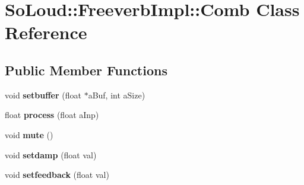 \hypertarget{class_so_loud_1_1_freeverb_impl_1_1_comb}{}\section{So\+Loud\+::Freeverb\+Impl\+::Comb Class Reference}
\label{class_so_loud_1_1_freeverb_impl_1_1_comb}
\subsection*{Public Member Functions}
\begin{DoxyCompactItemize}
\item 
\mbox{\label{class_so_loud_1_1_freeverb_impl_1_1_comb_a73d6b9bffd5dc9d15f9dc405a2eaca74}} 
void {\bfseries setbuffer} (float $\ast$a\+Buf, int a\+Size)
\item 
\mbox{\label{class_so_loud_1_1_freeverb_impl_1_1_comb_a05456e28baf24a7c9c4e41affc60df97}} 
float {\bfseries process} (float a\+Inp)
\item 
\mbox{\label{class_so_loud_1_1_freeverb_impl_1_1_comb_a6bb88f40114912fa6919b05a55907b8a}} 
void {\bfseries mute} ()
\item 
\mbox{\label{class_so_loud_1_1_freeverb_impl_1_1_comb_ab08a2f4a92b27dc27031f11fd7a4cfd6}} 
void {\bfseries setdamp} (float val)
\item 
\mbox{\label{class_so_loud_1_1_freeverb_impl_1_1_comb_a8755177097b2561c8f3aaf68b6a13a73}} 
void {\bfseries setfeedback} (float val)
\end{DoxyCompactItemize}
